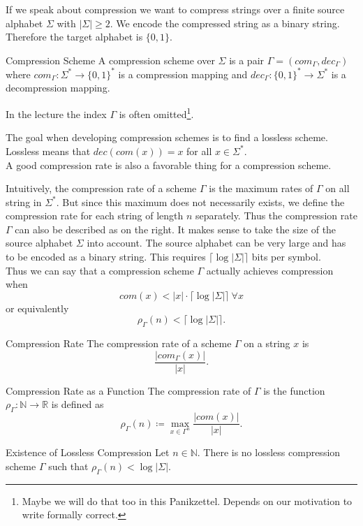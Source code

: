 \documentclass{panikzettel}
\begin{document}
If we speak about compression we want to compress strings over a finite source alphabet $\Sigma$ with $|\Sigma|\geq 2$. We encode the compressed string as a binary string. Therefore the target alphabet is $\{0,1\}$.

\begin{defi}{Compression Scheme}
A compression scheme over $\Sigma$ is a pair $\Gamma=(com_\Gamma, dec_\Gamma)$ where $com_\Gamma: \Sigma^* \rightarrow \{0,1\}^*$ is a compression mapping and $dec_\Gamma:\{0,1\}^*\to \Sigma^*$ is a decompression mapping.
\end{defi}

In the lecture the index $\Gamma$ is often omitted\footnote{ Maybe we will do that too in this Panikzettel. Depends on our motivation to write formally correct.}.

The goal when developing compression schemes is to find a lossless scheme. Lossless means that $dec(com(x))=x$ for all $x\in\Sigma^*$.\\
A good compression rate is also a favorable thing for a compression scheme.

\begin{halfboxl}
\vspace{-\baselineskip}
	Intuitively, the compression rate of a scheme $\Gamma$ is the maximum rates of $\Gamma$ on all string in $\Sigma^*$. But since this maximum does not necessarily exists, we define the compression rate for each string of length $n$ separately. Thus the compression rate $\Gamma$ can also be described as on the right.
	It makes sense to take the size of the source alphabet $\Sigma$ into account. The source alphabet can be very large and has to be encoded as a binary string. This requires $\lceil\log |\Sigma|\rceil$ bits per symbol.\\
	Thus we can say that a compression scheme $\Gamma$ actually achieves compression when
	\[
	com(x)<|x| \cdot \lceil \log |\Sigma| \rceil \ \forall x
	\]
	or equivalently
	\[
	\rho_\Gamma(n)<\lceil \log|\Sigma| \rceil.
	\]
\end{halfboxl}
\begin{halfboxr}
\vspace{-\baselineskip}
	\begin{defi}{Compression Rate}
	The compression rate of a scheme $\Gamma$ on a string $x$ is
	\[
	\frac{|com_\Gamma(x)|}{|x|}.
	\]
	\end{defi}
	\begin{defi}{Compression Rate as a Function}
	The compression rate of $\Gamma$ is the function $\rho_\Gamma:\mathbb{N}\to \mathbb{R}$ is defined as
	\[
	\rho_\Gamma(n)\coloneqq \max_{x\in\Gamma^n}\frac{|com(x)|}{|x|}.
	\]
	\end{defi}
	\begin{theo}{Existence of Lossless Compression}
	Let $n\in\mathbb{N}$. There is no lossless compression scheme $\Gamma$ such that $\rho_\Gamma(n)<\log |\Sigma|$.
	\end{theo}
\end{halfboxr}
\end{document}
